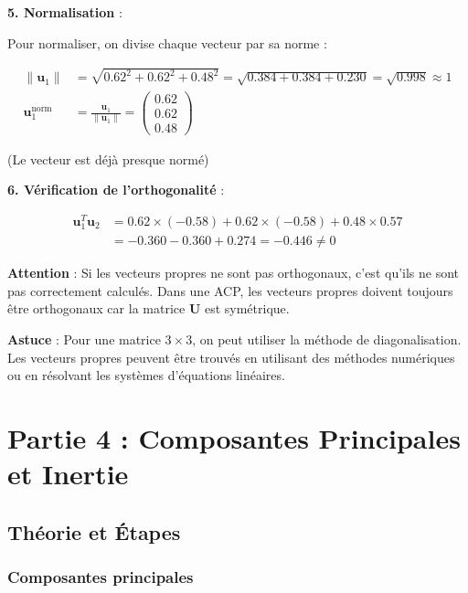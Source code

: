 \documentclass[11pt,a4paper]{article}
\begin{document}
\textbf{5. Normalisation} :

Pour normaliser, on divise chaque vecteur par sa norme :

\begin{align*}
\|\mathbf{u}_1\| &= \sqrt{0.62^2 + 0.62^2 + 0.48^2} = \sqrt{0.384 + 0.384 + 0.230} = \sqrt{0.998} \approx 1 \\
\mathbf{u}_1^{\text{norm}} &= \frac{\mathbf{u}_1}{\|\mathbf{u}_1\|} = \begin{pmatrix} 0.62 \\ 0.62 \\ 0.48 \end{pmatrix}
\end{align*}

(Le vecteur est déjà presque normé)

\textbf{6. Vérification de l'orthogonalité} :

\begin{align*}
\mathbf{u}_1^T \mathbf{u}_2 &= 0.62 \times (-0.58) + 0.62 \times (-0.58) + 0.48 \times 0.57 \\
&= -0.360 - 0.360 + 0.274 = -0.446 \neq 0
\end{align*}

\begin{attentionbox}
\textbf{Attention} : Si les vecteurs propres ne sont pas orthogonaux, c'est qu'ils ne sont pas correctement calculés. Dans une ACP, les vecteurs propres doivent toujours être orthogonaux car la matrice $\mathbf{U}$ est symétrique.
\end{attentionbox}

\begin{astucebox}
\textbf{Astuce} : Pour une matrice $3 \times 3$, on peut utiliser la méthode de diagonalisation. Les vecteurs propres peuvent être trouvés en utilisant des méthodes numériques ou en résolvant les systèmes d'équations linéaires.
\end{astucebox}

\newpage

\section{Partie 4 : Composantes Principales et Inertie}

\subsection{Théorie et Étapes}

\subsubsection{Composantes principales}
\end{document}
